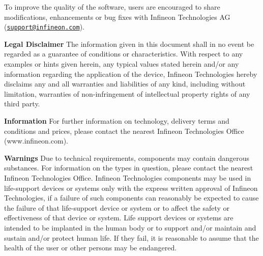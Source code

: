 To improve the quality of the software, users are encouraged to share modifications, enhancements or bug fixes with Infineon Technologies AG (\href{mailto:support@infineon.com}{\tt support@infineon.\+com}).

{\bfseries Legal Disclaimer} The information given in this document shall in no event be regarded as a guarantee of conditions or characteristics. With respect to any examples or hints given herein, any typical values stated herein and/or any information regarding the application of the device, Infineon Technologies hereby disclaims any and all warranties and liabilities of any kind, including without limitation, warranties of non-\/infringement of intellectual property rights of any third party.

{\bfseries Information} For further information on technology, delivery terms and conditions and prices, please contact the nearest Infineon Technologies Office (www.\+infineon.\+com).

{\bfseries Warnings} Due to technical requirements, components may contain dangerous substances. For information on the types in question, please contact the nearest Infineon Technologies Office. Infineon Technologies components may be used in life-\/support devices or systems only with the express written approval of Infineon Technologies, if a failure of such components can reasonably be expected to cause the failure of that life-\/support device or system or to affect the safety or effectiveness of that device or system. Life support devices or systems are intended to be implanted in the human body or to support and/or maintain and sustain and/or protect human life. If they fail, it is reasonable to assume that the health of the user or other persons may be endangered. 